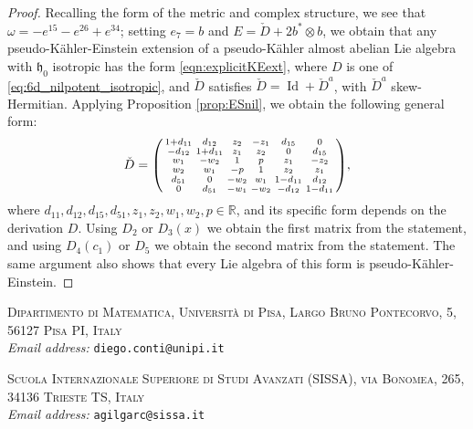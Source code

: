 \documentclass{article}
\theoremstyle{definition}
\DeclareMathOperator{\Id}{Id}
\newcommand{\R}{\mathbb{R}}
\newcommand{\frh}{\mathfrak{h}}
\newenvironment{smallpmatrix}{\left(\begin{smallmatrix}}{\end{smallmatrix}\right)}
\begin{document}
\begin{proof}
    Recalling the form of the metric and complex structure, we see that $\omega=-e^{15}-e^{26}+e^{34}$; setting $e_7=b$ and $E=\check{D}+2b^*\otimes b$, we obtain that any pseudo-Kähler-Einstein extension of a pseudo-Kähler almost abelian Lie algebra with $\frh_0$ isotropic has the form \eqref{eqn:explicitKEext}, where $D$ is one of \eqref{eq:6d_nilpotent_isotropic}, and $\check{D}$ satisfies $\check{D}=\Id+\check{D}^a$, with $\check{D}^a$ skew-Hermitian. Applying Proposition \ref{prop:ESnil}, we obtain the following general form: $$\check{D}=\begin{smallpmatrix}
        1+d_{11}&d_{12}&z_2&-z_1&d_{15}&0\\
        -d_{12}&1+d_{11}&z_1&z_2&0&d_{15}\\
        w_1&-w_2&1&p&z_1&-z_2\\
        w_2&w_1&-p&1&z_2&z_1\\
        d_{51}&0&-w_2&w_1&1-d_{11}&d_{12}\\
        0&d_{51}&-w_1&-w_2&-d_{12}&1-d_{11}
    \end{smallpmatrix},$$ where $d_{11},d_{12},d_{15},d_{51},z_1,z_2,w_1,w_2,p\in\R$, and its specific form depends on the derivation $D$. Using $D_2$ or $D_3(x)$ we obtain the first matrix from the statement, and using $D_4(c_1)$ or $D_5$ we obtain the second matrix from the statement. The same argument also shows that every Lie algebra of this form is pseudo-Kähler-Einstein.
\end{proof}





\small\textsc{Dipartimento di Matematica, Università di Pisa, Largo Bruno Pontecorvo, 5, 56127 Pisa PI, Italy}\\
\textit{Email address:} \texttt{diego.conti@unipi.it}

\medskip

\small\textsc{Scuola Internazionale Superiore di Studi Avanzati (SISSA), via Bonomea, 265, 34136 Trieste TS, Italy}\\
\textit{Email address:} \texttt{agilgarc@sissa.it}
\end{document}
